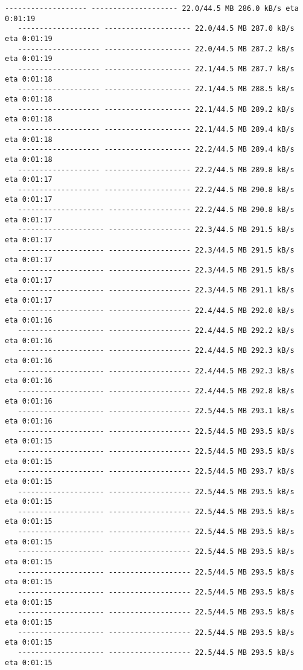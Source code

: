 \documentclass[11pt]{article}
\begin{document}
\begin{Verbatim}[commandchars=\\\{\}]
   ------------------- -------------------- 22.0/44.5 MB 286.0 kB/s eta 0:01:19
   ------------------- -------------------- 22.0/44.5 MB 287.0 kB/s eta 0:01:19
   ------------------- -------------------- 22.0/44.5 MB 287.2 kB/s eta 0:01:19
   ------------------- -------------------- 22.1/44.5 MB 287.7 kB/s eta 0:01:18
   ------------------- -------------------- 22.1/44.5 MB 288.5 kB/s eta 0:01:18
   ------------------- -------------------- 22.1/44.5 MB 289.2 kB/s eta 0:01:18
   ------------------- -------------------- 22.1/44.5 MB 289.4 kB/s eta 0:01:18
   ------------------- -------------------- 22.2/44.5 MB 289.4 kB/s eta 0:01:18
   ------------------- -------------------- 22.2/44.5 MB 289.8 kB/s eta 0:01:17
   ------------------- -------------------- 22.2/44.5 MB 290.8 kB/s eta 0:01:17
   -------------------- ------------------- 22.2/44.5 MB 290.8 kB/s eta 0:01:17
   -------------------- ------------------- 22.3/44.5 MB 291.5 kB/s eta 0:01:17
   -------------------- ------------------- 22.3/44.5 MB 291.5 kB/s eta 0:01:17
   -------------------- ------------------- 22.3/44.5 MB 291.5 kB/s eta 0:01:17
   -------------------- ------------------- 22.3/44.5 MB 291.1 kB/s eta 0:01:17
   -------------------- ------------------- 22.4/44.5 MB 292.0 kB/s eta 0:01:16
   -------------------- ------------------- 22.4/44.5 MB 292.2 kB/s eta 0:01:16
   -------------------- ------------------- 22.4/44.5 MB 292.3 kB/s eta 0:01:16
   -------------------- ------------------- 22.4/44.5 MB 292.3 kB/s eta 0:01:16
   -------------------- ------------------- 22.4/44.5 MB 292.8 kB/s eta 0:01:16
   -------------------- ------------------- 22.5/44.5 MB 293.1 kB/s eta 0:01:16
   -------------------- ------------------- 22.5/44.5 MB 293.5 kB/s eta 0:01:15
   -------------------- ------------------- 22.5/44.5 MB 293.5 kB/s eta 0:01:15
   -------------------- ------------------- 22.5/44.5 MB 293.7 kB/s eta 0:01:15
   -------------------- ------------------- 22.5/44.5 MB 293.5 kB/s eta 0:01:15
   -------------------- ------------------- 22.5/44.5 MB 293.5 kB/s eta 0:01:15
   -------------------- ------------------- 22.5/44.5 MB 293.5 kB/s eta 0:01:15
   -------------------- ------------------- 22.5/44.5 MB 293.5 kB/s eta 0:01:15
   -------------------- ------------------- 22.5/44.5 MB 293.5 kB/s eta 0:01:15
   -------------------- ------------------- 22.5/44.5 MB 293.5 kB/s eta 0:01:15
   -------------------- ------------------- 22.5/44.5 MB 293.5 kB/s eta 0:01:15
   -------------------- ------------------- 22.5/44.5 MB 293.5 kB/s eta 0:01:15
   -------------------- ------------------- 22.5/44.5 MB 293.5 kB/s eta 0:01:15

\end{Verbatim}
\end{document}
